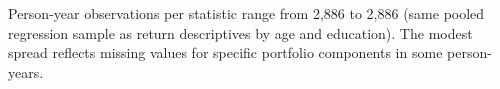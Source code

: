 Person-year observations per statistic range from 2{,}886 to 2{,}886 (same pooled regression sample as return descriptives by age and education). The modest spread reflects missing values for specific portfolio components in some person-years.
